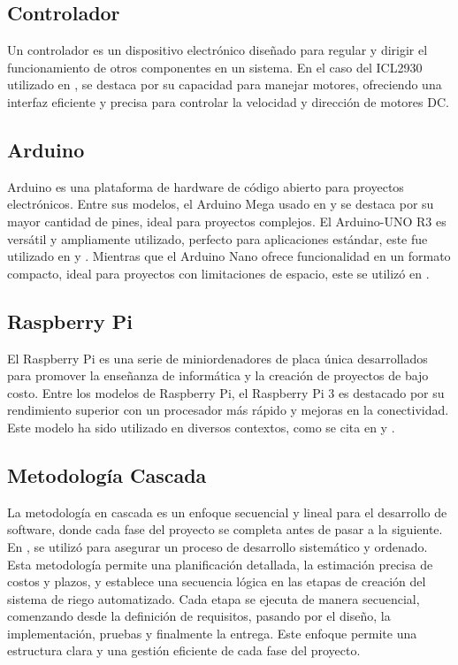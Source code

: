 \subsection{Controlador}
Un controlador es un dispositivo electrónico diseñado para regular y dirigir el funcionamiento de otros componentes en un sistema. En el caso del ICL2930 utilizado en \cite{hasan_implementation_2018}, se destaca por su capacidad para manejar motores, ofreciendo una interfaz eficiente y precisa para controlar la velocidad y dirección de motores DC.

\subsection*{Arduino}
Arduino es una plataforma de hardware de código abierto para proyectos electrónicos. Entre sus modelos, el Arduino Mega usado en \cite{lema_holguin_implementacion_2018} \cite{alcivar_dominguez_sistema_2018} y \cite{hasan_implementation_2018} se destaca por su mayor cantidad de pines, ideal para proyectos complejos. El Arduino-UNO R3 es versátil y ampliamente utilizado, perfecto para aplicaciones estándar, este fue utilizado en \cite{haiyan_intelligent_2022} y \cite{mohammed_intelligent_nodate} . Mientras que el Arduino Nano ofrece funcionalidad en un formato compacto, ideal para proyectos con limitaciones de espacio, este se utilizó en \cite{benyezza_zoning_2021}.

\subsection*{Raspberry Pi}
El Raspberry Pi es una serie de miniordenadores de placa única desarrollados para promover la enseñanza de informática y la creación de proyectos de bajo costo. Entre los modelos de Raspberry Pi, el Raspberry Pi 3 es destacado por su rendimiento superior con un procesador más rápido y mejoras en la conectividad. Este modelo ha sido utilizado en diversos contextos, como se cita en \cite{benyezza_zoning_2021} y \cite{orozco_jaramillo_diseno_2019}.

\subsection{Metodología Cascada}
La metodología en cascada es un enfoque secuencial y lineal para el desarrollo de software, donde cada fase del proyecto se completa antes de pasar a la siguiente. En \cite{alcivar_dominguez_sistema_2018}, se utilizó para asegurar un proceso de desarrollo sistemático y ordenado. Esta metodología permite una planificación detallada, la estimación precisa de costos y plazos, y establece una secuencia lógica en las etapas de creación del sistema de riego automatizado. Cada etapa se ejecuta de manera secuencial, comenzando desde la definición de requisitos, pasando por el diseño, la implementación, pruebas y finalmente la entrega. Este enfoque permite una estructura clara y una gestión eficiente de cada fase del proyecto.


